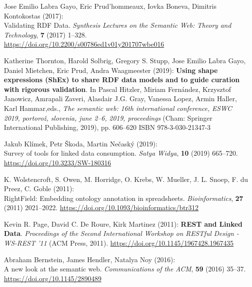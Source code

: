 \begin{thebibliography}{9}
Jose Emilio Labra Gayo, Eric Prud'hommeaux, Iovka Boneva, Dimitris
Kontokostas (2017): \\
Validating {RDF Data}. \emph{Synthesis Lectures on
the Semantic Web: Theory and Technology}, \textbf{7} (2017) 1--328.
\url{https://doi.org/10.2200/s00786ed1v01y201707wbe016}

Katherine Thornton, Harold Solbrig, Gregory S. Stupp, Jose Emilio Labra
Gayo, Daniel Mietchen, Eric Prud, Andra Waagmeester (2019):
\textbf{Using shape expressions ({ShEx}) to share {RDF} data models and
to guide curation with rigorous validation}. In Pascal Hitzler, Miriam
Fernández, Krzysztof Janowicz, Amrapali Zaveri, Alasdair J.G. Gray,
Vanessa Lopez, Armin Haller, Karl Hammar,eds., \emph{The semantic
web: 16th international conference, {ESWC} 2019, portorož, slovenia,
june 2--6, 2019, proceedings} ({Cham}: {Springer International
Publishing}, 2019), pp. 606--620 ISBN 978-3-030-21347-3

Jakub Klímek, Petr Škoda, Martin Nečaský (2019): \\
Survey of tools for
linked data consumption. \emph{Satya Widya}, \textbf{10} (2019)
665--720.
\url{https://doi.org/10.3233/SW-180316}

K. Wolstencroft, S. Owen, M. Horridge, O. Krebs, W. Mueller, J. L.
Snoep, F. du Preez, C. Goble (2011): \\
{RightField}: Embedding ontology
annotation in spreadsheets. \emph{Bioinformatics}, \textbf{27} (2011)
2021--2022.
\url{https://doi.org/10.1093/bioinformatics/btr312}

Kevin R. Page, David C. De Roure, Kirk Martinez (2011):
\textbf{{REST} and {Linked Data}}. \emph{Proceedings of the {Second
International Workshop} on {RESTful Design} - {WS-REST} '11} ({ACM
Press}, 2011).
\url{https://doi.org/10.1145/1967428.1967435}

Abraham Bernstein, James Hendler, Natalya Noy (2016): \\
A new look at
the semantic web. \emph{Communications of the ACM}, \textbf{59} (2016)
35--37.
\url{https://doi.org/10.1145/2890489}


\end{thebibliography}
